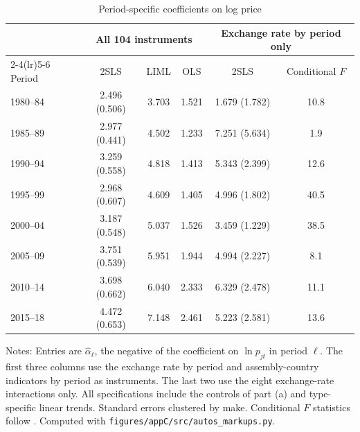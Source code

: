 \begin{table}[htbp]
\centering
\caption{Period-specific coefficients on log price}
\label{tab:C-autos-periods}
\footnotesize
\begin{tabular}{@{}lccccc@{}}
\toprule
 & \multicolumn{3}{c}{All 104 instruments} & \multicolumn{2}{c}{Exchange rate by period only} \\
\cmidrule(lr){2-4}\cmidrule(lr){5-6}
Period & 2SLS & LIML & OLS & 2SLS & Conditional $F$ \\
\midrule
1980--84 & 2.496 (0.506) & 3.703 & 1.521 & 1.679 (1.782) & 10.8 \\
1985--89 & 2.977 (0.441) & 4.502 & 1.233 & 7.251 (5.634) & 1.9 \\
1990--94 & 3.259 (0.558) & 4.818 & 1.413 & 5.343 (2.399) & 12.6 \\
1995--99 & 2.968 (0.607) & 4.609 & 1.405 & 4.996 (1.802) & 40.5 \\
2000--04 & 3.187 (0.548) & 5.037 & 1.526 & 3.459 (1.229) & 38.5 \\
2005--09 & 3.751 (0.539) & 5.951 & 1.944 & 4.994 (2.227) & 8.1 \\
2010--14 & 3.698 (0.662) & 6.040 & 2.333 & 6.329 (2.478) & 11.1 \\
2015--18 & 4.472 (0.653) & 7.148 & 2.461 & 5.223 (2.581) & 13.6 \\
\bottomrule
\end{tabular}

\vspace{3pt}
\begin{minipage}{0.97\textwidth}
\footnotesize Notes: Entries are $\hat\alpha_\ell$, the negative of the coefficient on $\ln p_{jt}$ in period $\ell$.
The first three columns use the exchange rate by period and assembly-country indicators by period as instruments. The
last two use the eight exchange-rate interactions only. All specifications include the controls of part (a) and
type-specific linear trends. Standard errors clustered by make. Conditional $F$ statistics follow
\citet{SandersonWindmeijer2016}. Computed with \texttt{figures/appC/src/autos\_markups.py}.
\end{minipage}
\end{table}

